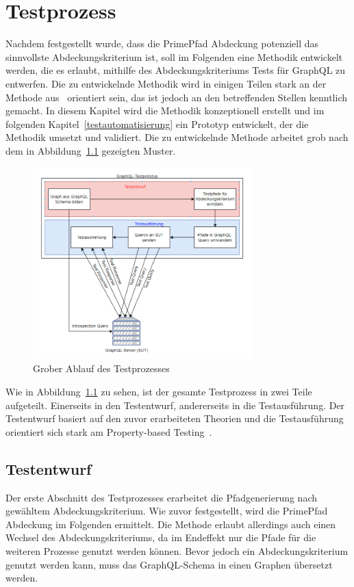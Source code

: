 \chapter{Testprozess}
\label{testentwurf}

Nachdem festgestellt wurde, dass die PrimePfad Abdeckung potenziell das sinnvollste Abdeckungskriterium ist, soll im Folgenden eine
Methodik entwickelt werden, die es erlaubt, mithilfe des Abdeckungskriteriums Tests für GraphQL zu entwerfen.
Die zu entwickelnde Methodik wird in einigen Teilen stark an der Methode aus~\cite{property-based-testing} orientiert sein, das ist jedoch an den betreffenden Stellen kenntlich gemacht.
In diesem Kapitel wird die Methodik konzeptionell erstellt und im folgenden Kapitel~\ref{testautomatisierung} ein Prototyp entwickelt, der
die Methodik umsetzt und validiert.
Die zu entwickelnde Methode arbeitet grob nach dem in Abbildung~\ref{methodeablauf} gezeigten Muster.

\begin{figure}[H]
    \centering
    \includegraphics[width=0.75\textwidth,keepaspectratio]{img/fktweiseprototyp}
    \caption{Grober Ablauf des Testprozesses}
    \label{methodeablauf}
\end{figure}

Wie in Abbildung~\ref{methodeablauf} zu sehen, ist der gesamte Testprozess in zwei Teile aufgeteilt.
Einerseits in den Testentwurf, andererseits in die Testausführung.
Der Testentwurf basiert auf den zuvor erarbeiteten Theorien und die Testausführung orientiert sich stark am
Property-based Testing~\cite[vgl. Method]{property-based-testing}.

\section{Testentwurf}
\label{testentw}
Der erste Abschnitt des Testprozesses erarbeitet die Pfadgenerierung nach gewähltem Abdeckungskriterium.
Wie zuvor festgestellt, wird die PrimePfad Abdeckung im Folgenden ermittelt.
Die Methode erlaubt allerdings auch einen Wechsel des Abdeckungskriteriums, da im Endeffekt nur die Pfade für die weiteren Prozesse
genutzt werden können.
Bevor jedoch ein Abdeckungskriterium genutzt werden kann, muss das GraphQL-Schema in einen Graphen übersetzt werden.

